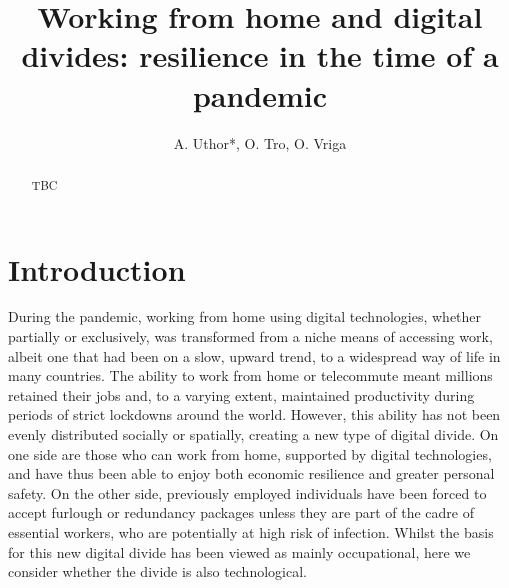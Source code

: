 \documentclass[Royal,times,sageh]{sagej}
\begin{document}
\title{Working from home and digital divides: resilience in the time of a
pandemic}

\runninghead{}

\author{A. Uthor*, O. Tro, O. Vriga}




\begin{abstract}
TBC
\end{abstract}


\maketitle

\hypertarget{sec:1}{%
\section{Introduction}\label{sec:1}}

During the pandemic, working from home using digital technologies,
whether partially or exclusively, was transformed from a niche means of
accessing work, albeit one that had been on a slow, upward trend, to a
widespread way of life in many countries. The ability to work from home
or telecommute meant millions retained their jobs and, to a varying
extent, maintained productivity during periods of strict lockdowns
around the world. However, this ability has not been evenly distributed
socially or spatially, creating a new type of digital divide. On one
side are those who can work from home, supported by digital
technologies, and have thus been able to enjoy both economic resilience
and greater personal safety. On the other side, previously employed
individuals have been forced to accept furlough or redundancy packages
unless they are part of the cadre of essential workers, who are
potentially at high risk of infection. Whilst the basis for this new
digital divide has been viewed as mainly occupational, here we consider
whether the divide is also technological.
\end{document}
